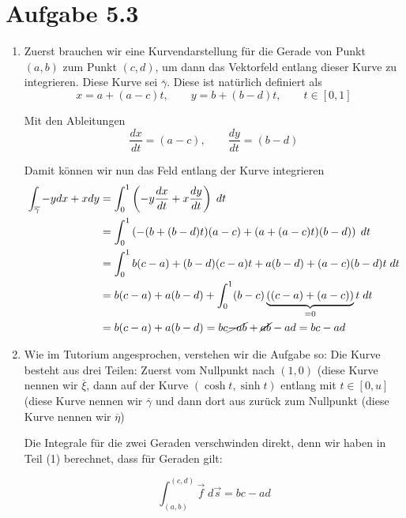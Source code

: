 \documentclass[a4paper,german,12pt,smallheadings]{scrartcl}
\begin{document}
\section*{Aufgabe 5.3}
\begin{enumerate}[(1)]
  \item
    Zuerst brauchen wir eine Kurvendarstellung für die Gerade von Punkt $(a,b)$
    zum Punkt $(c,d)$, um dann das Vektorfeld entlang dieser Kurve zu
    integrieren. Diese Kurve sei $\overline{\gamma}$. Diese ist natürlich
    definiert als
    \begin{equation*}
      x = a + (a-c)t, \qquad y = b + (b-d)t, \qquad t \in [0,1]
    \end{equation*}

    Mit den Ableitungen
    \begin{equation*}
      \frac{dx}{dt} = (a-c), \qquad \frac{dy}{dt} = (b-d)
    \end{equation*}

    Damit können wir nun das Feld entlang der Kurve integrieren
    \begin{align*}
      \int_{\overline{\gamma}} -y dx + x dy &= \int_0^1 \left(-y \frac{dx}{dt} + x \frac{dy}{dt}\right) \; dt \\
                                            &= \int_0^1 \left(-(b + (b-d)t)(a-c) + (a+(a-c)t)(b-d)\right) \; dt \\
                                            &= \int_0^1 b(c-a) + (b-d)(c-a)t + a(b-d)+(a-c)(b-d)t \; dt \\
                                            &= b(c-a)+a(b-d) +\int_0^1 (b-c)\underbrace{((c-a) + (a-c))}_{=0}t \; dt \\
                                            &= b(c-a)+a(b-d) = bc\cancel{-ab}+\cancel{ab}-ad = bc-ad
    \end{align*}
  \item
    Wie im Tutorium angesprochen, verstehen wir die Aufgabe so: Die Kurve
    besteht aus drei Teilen: Zuerst vom Nullpunkt nach $(1,0)$ (diese Kurve
    nennen wir $\overline{\xi}$, dann auf der Kurve $(\cosh t, \sinh t)$
    entlang mit $t \in [0, u]$ (diese Kurve nennen wir $\overline{\gamma}$ und
    dann dort aus zurück zum Nullpunkt (diese Kurve nennen wir
    $\overline{\eta}$)

    Die Integrale für die zwei Geraden verschwinden direkt, denn wir haben in
    Teil (1) berechnet, dass für Geraden gilt:

    \begin{equation*}
      \int_{(a,b)}^{(c,d)} \vec{f} \; d\vec{s} = bc-ad
    \end{equation*}


\end{enumerate}
\end{document}

